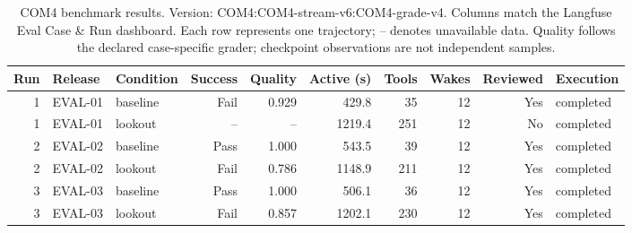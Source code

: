 \begin{table}[t]
\centering\scriptsize
\begin{tabular}{@{}rllrrrrrrl@{}}
\toprule
Run & Release & Condition & Success & Quality & Active (s) & Tools & Wakes & Reviewed & Execution \\
\midrule
1 & EVAL-01 & baseline & Fail & 0.929 & 429.8 & 35 & 12 & Yes & completed \\
1 & EVAL-01 & lookout & -- & -- & 1219.4 & 251 & 12 & No & completed \\
2 & EVAL-02 & baseline & Pass & 1.000 & 543.5 & 39 & 12 & Yes & completed \\
2 & EVAL-02 & lookout & Fail & 0.786 & 1148.9 & 211 & 12 & Yes & completed \\
3 & EVAL-03 & baseline & Pass & 1.000 & 506.1 & 36 & 12 & Yes & completed \\
3 & EVAL-03 & lookout & Fail & 0.857 & 1202.1 & 230 & 12 & Yes & completed \\
\bottomrule
\end{tabular}
\caption{COM4 benchmark results. Version: COM4:COM4-stream-v6:COM4-grade-v4. Columns match the Langfuse Eval Case \& Run dashboard. Each row represents one trajectory; -- denotes unavailable data. Quality follows the declared case-specific grader; checkpoint observations are not independent samples.}
\label{tab:com-results-4}
\end{table}
